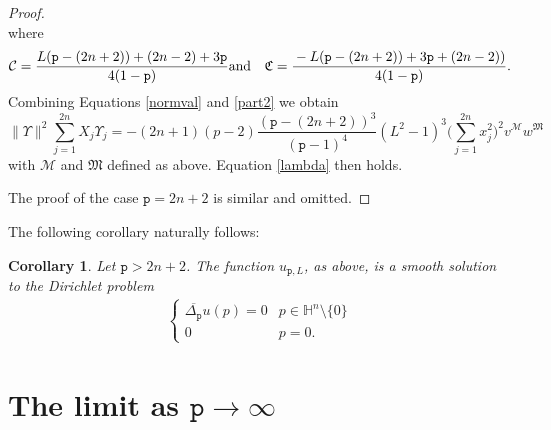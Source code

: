 \documentclass[12pt]{amsart}
\theoremstyle{plain}
\newtheorem{corollary}[theorem]{Corollary}
\theoremstyle{definition}
\numberwithin{equation}{section}
\begin{document}
\begin{proof}
\begin{equation}
\end{equation}
where 
\begin{eqnarray*}
\mathcal{C}=\frac{{\displaystyle} L({\texttt{p}}-(2n+2)) + (2n-2) + 3{\texttt{p}}}{{\displaystyle} 4(1-{\texttt{p}})}& \textmd{and} &
\mathfrak{C}=\frac{{\displaystyle} -L({\texttt{p}}-(2n+2))+3{\texttt{p}}+(2n-2))}{{\displaystyle} 4(1-{\texttt{p}})}.
\end{eqnarray*}
Combining Equations \eqref{normval} and \eqref{part2} we obtain
\begin{equation}\label{part2combine}
\|\Upsilon\|^{2}\sum_{j=1}^{2n}X_j\Upsilon_j =
-(2n+1)(p-2)\frac{ ({\texttt{p}}-(2n+2))^3}{({\texttt{p}}-1)^4}(L^2-1)^3\Big(\sum_{j=1}^{2n}x_j^2 \Big)^2v^{\mathcal{M}}w^{\mathfrak{M}}
\end{equation}
with $\mathcal{M}$ and $\mathfrak{M}$ defined as above. Equation \eqref{lambda} then holds. 

The proof of the case ${\texttt{p}} = 2n+2$ is similar and omitted. 
\end{proof}

The following corollary naturally follows:
\begin{corollary}\label{hsmooth}
Let ${\texttt{p}}>2n+2$. The function $u_{{\texttt{p}},L}$, as above, is a smooth solution to the Dirichlet problem
\begin{eqnarray*}
\left\{\begin{array}{cc}
\overline{\Delta_{\texttt{p}}}u(p)=0 & p \in \mathbb{H}^n\setminus\{0\} \\
0 & p = 0.
\end{array}\right.
\end{eqnarray*}
\end{corollary}
\section{The limit as ${\texttt{p}} \to \infty$}
\end{document}
